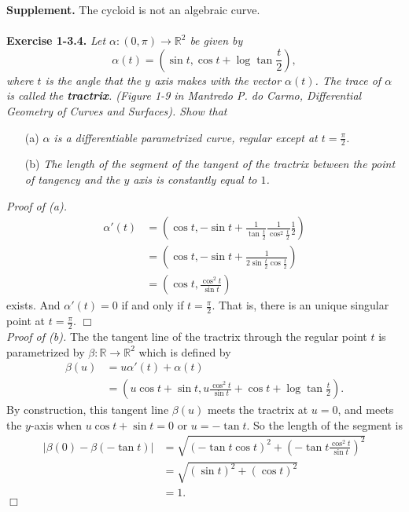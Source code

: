 \documentclass{article}
\begin{document}
\textbf{Supplement.}
The cycloid is not an algebraic curve. \\\\






\textbf{Exercise 1-3.4.}
\emph{Let $\alpha: (0, \pi) \to \mathbb{R}^2$ be given by
$$\alpha(t) = \left(\sin t, \cos t + \log\tan\frac{t}{2}\right),$$
where $t$ is the angle that the $y$ axis makes with the vector $\alpha(t)$.
The trace of $\alpha$ is called the \textbf{tractrix}.
(Figure 1-9 in Mantredo P. do Carmo, Differential Geometry of Curves and Surfaces).
Show that}
\begin{enumerate}
  \item[(a)]
  \emph{$\alpha$ is a differentiable parametrized curve,
  regular except at $t = \frac{\pi}{2}$.}
  \item[(b)]
  \emph{The length of the segment of the tangent of the tractrix between
  the point of tangency and the $y$ axis is constantly equal to $1$.} \\
\end{enumerate}

\emph{Proof of (a).}
\begin{align*}
\alpha'(t)
&= \left(
\cos t,
-\sin t + \frac{1}{\tan\frac{t}{2}} \frac{1}{\cos^{2}\frac{t}{2}} \frac{1}{2}
\right) \\
&= \left(
\cos t,
-\sin t + \frac{1}{2 \sin\frac{t}{2} \cos\frac{t}{2}}
\right) \\
&= \left(
\cos t,
\frac{\cos^2 t}{\sin t}
\right)
\end{align*}
exists.
And $\alpha'(t) = 0$ if and only if $t = \frac{\pi}{2}$.
That is, there is an unique singular point at $t = \frac{\pi}{2}$.
$\Box$ \\

\emph{Proof of (b).}
The the tangent line of the tractrix through the regular point $t$
is parametrized by $\beta: \mathbb{R} \to \mathbb{R}^2$ which is defined by
\begin{align*}
\beta(u)
&= u\alpha'(t) + \alpha(t) \\
&= \left( u \cos t + \sin t, u \frac{\cos^2 t}{\sin t} + \cos t + \log\tan\frac{t}{2} \right).
\end{align*}
By construction, this tangent line $\beta(u)$ meets the tractrix at $u = 0$,
and meets the $y$-axis when $u \cos t + \sin t = 0$ or $u = -\tan t$.
So the length of the segment is
\begin{align*}
|\beta(0) - \beta(-\tan t)|
&= \sqrt{(-\tan t \cos t)^2+ \left( -\tan t \frac{\cos^2 t}{\sin t} \right)^2} \\
&= \sqrt{(\sin t)^2+ (\cos t)^2} \\
&= 1.
\end{align*}
$\Box$ \\\\
\end{document}
